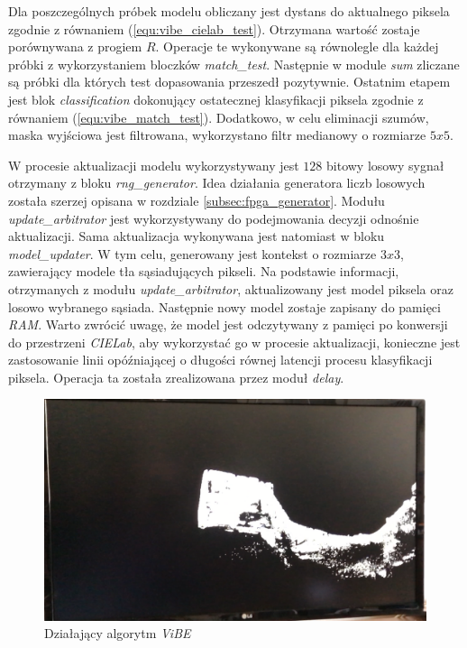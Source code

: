 Dla poszczególnych próbek modelu obliczany jest dystans do aktualnego piksela zgodnie z równaniem (\ref{equ:vibe_cielab_test}). 
Otrzymana wartość zostaje porównywana z progiem $R$. 
Operacje te wykonywane są równolegle dla każdej próbki z wykorzystaniem bloczków \textit{match\_test}. 
Następnie w module \textit{sum} zliczane są próbki dla których test dopasowania przeszedł pozytywnie. 
Ostatnim etapem jest blok \textit{classification} dokonujący ostatecznej klasyfikacji piksela zgodnie z równaniem (\ref{equ:vibe_match_test}). Dodatkowo, w celu eliminacji szumów, maska wyjściowa jest filtrowana, wykorzystano filtr medianowy o rozmiarze $5x5$. %

W procesie aktualizacji modelu wykorzystywany jest $128$ bitowy losowy sygnał otrzymany z bloku \textit{rng\_generator}. 
Idea działania generatora liczb losowych została szerzej opisana w rozdziale \ref{subsec:fpga_generator}. 
Modułu \textit{update\_arbitrator} jest wykorzystywany do podejmowania decyzji odnośnie aktualizacji. 
Sama aktualizacja wykonywana jest natomiast w bloku \textit{model\_updater}. 
W tym celu, generowany jest kontekst o rozmiarze $3x3$, zawierający modele tła sąsiadujących pikseli. 
Na podstawie informacji, otrzymanych z modułu \textit{update\_arbitrator}, aktualizowany jest model piksela oraz losowo wybranego sąsiada.
Następnie nowy model zostaje zapisany do pamięci \textit{RAM}. 
Warto zwrócić uwagę, że model jest odczytywany z pamięci po konwersji do przestrzeni \textit{CIELab}, aby wykorzystać go w procesie aktualizacji, konieczne jest zastosowanie linii opóźniającej o długości równej latencji procesu klasyfikacji piksela. 
Operacja ta została zrealizowana przez moduł \textit{delay}.

	\begin{figure}[h!]
		\centering
		\includegraphics[scale=0.2]{img/4/vibe_example.png}
		\caption{Działający algorytm \textit{ViBE}}
		\label{fig:vibe_demo}
	\end{figure}


